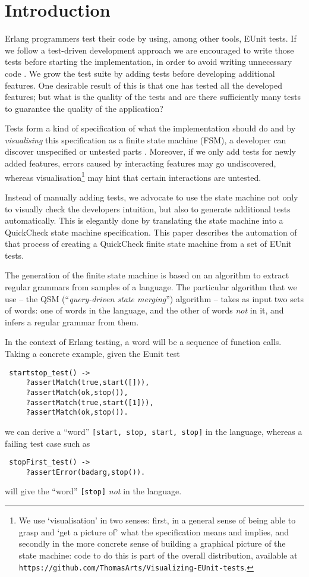 \documentclass[]{sigplanconf}
\begin{document}
\section{Introduction}

Erlang programmers test their code by using, among other tools,
EUnit tests. If we follow a test-driven development approach we are
encouraged to write those tests before starting the implementation,
in order to avoid writing unnecessary code \cite{beck2003test}. We grow
the test suite by adding tests before developing additional features. One desirable result of this is that one has tested all the developed features; but what is the quality of the 
tests and are there sufficiently many tests to guarantee the quality of the application?

Tests form a kind of specification of what the implementation should do and by \emph{visualising} this specification as a finite state machine (FSM), a developer can discover unspecified or untested parts \cite{arts2010test}. Moreover, if we only add tests for newly added features, errors caused by interacting features may go undiscovered, whereas visualisation\footnote{We use `visualisation' in two senses: first, in a general sense of being able to grasp and `get a picture of' what the specification means and implies, and secondly in the more concrete sense of building a graphical picture of the state machine: code to do this is part of the overall distribution, available at \texttt{https://github.com/ThomasArts/Visualizing-EUnit-tests}.} may hint that certain interactions are untested. 

Instead of manually adding tests, we advocate to use the state machine not only to visually check the developers intuition, but also to generate additional tests automatically. This is elegantly done by translating the state machine into a QuickCheck state machine specification.
This paper describes the automation of that process of creating a QuickCheck finite state machine from a set of EUnit tests.  

The generation of the finite state machine is based on an algorithm to extract regular grammars from samples of a language. The particular algorithm that we use -- the QSM (``\emph{query-driven state merging}'') algorithm \cite{dupont2008qsm} --  takes as input two sets of words: one of words in the language, and the other of words \emph{not} in it, and infers a regular grammar from them. 

In the context of Erlang testing, a word will be a sequence of function calls. Taking a concrete example, given the Eunit test
\begin{verbatim}
 startstop_test() ->
     ?assertMatch(true,start([])),
     ?assertMatch(ok,stop()),
     ?assertMatch(true,start([1])),
     ?assertMatch(ok,stop()).
\end{verbatim}
we can derive a ``word'' \verb+[start, stop, start, stop]+ in the language, whereas a failing test case such as
\begin{verbatim}
 stopFirst_test() -> 
     ?assertError(badarg,stop()).
\end{verbatim}
will give the ``word'' \verb+[stop]+ \emph{not} in the language. 
\end{document}
